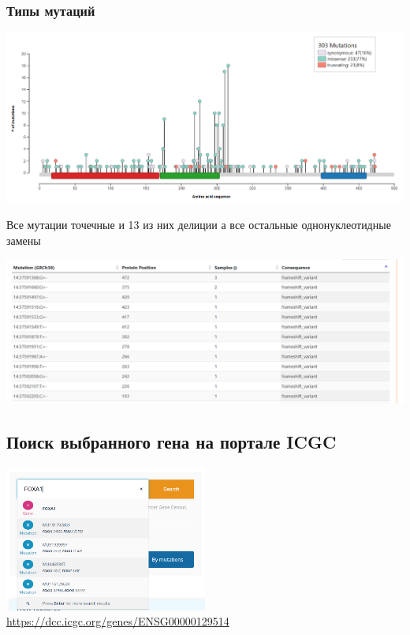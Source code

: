 \documentclass{article}
\begin{document}
  \subsubsection{Типы мутаций}
  \includegraphics[width=\textwidth]{mutation plot.png}

  \noindent
  Все мутации точечные и 13 из них делиции а все остальные однонуклеотидные замены

  \noindent
  \includegraphics[width=\textwidth]{deletion mutations.png}

  \subsection{Поиск выбранного гена на портале ICGC}
  \begin{center}
    \includegraphics[width=0.5\textwidth]{search 2.png}\\
    \url{https://dcc.icgc.org/genes/ENSG00000129514}
  \end{center}
\end{document}
